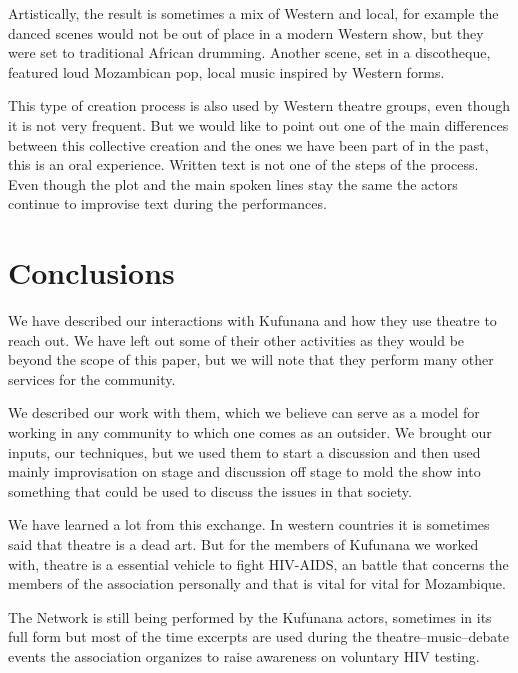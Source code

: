 \documentclass[article,twocolumn]{memoir}
\begin{document}
Artistically, the result is sometimes a mix of Western and local, for example
the danced scenes would not be out of place in a modern Western show, but they
were set to traditional African drumming. Another scene, set in a discotheque,
featured loud Mozambican pop, local music inspired by Western forms.

This type of creation process is also used by Western theatre groups, even
though it is not very frequent. But we would like to point out one of the main
differences between this collective creation and the ones we have been part of
in the past, this is an oral experience. Written text is not one of the steps of
the process. Even though the plot and the main spoken lines stay the same the
actors continue to improvise text during the performances.

\chapter{Conclusions}

We have described our interactions with Kufunana and how they use theatre to
reach out. We have left out some of their other activities as they would be
beyond the scope of this paper, but we will note that they perform many other
services for the community.

We described our work with them, which we believe can serve as a model for
working in any community to which one comes as an outsider. We brought our
inputs, our techniques, but we used them to start a discussion and then used
mainly improvisation on stage and discussion off stage to mold the show into
something that could be used to discuss the issues in that society.

We have learned a lot from this exchange. In western countries it is sometimes
said that theatre is a dead art. But for the members of Kufunana we worked
with, theatre is a essential vehicle to fight HIV-AIDS, an battle that concerns
the members of the association personally and that is vital for vital for
Mozambique.

The Network is still being performed by the Kufunana actors, sometimes in its
full form but most of the time excerpts are used during the
theatre--music--debate events the association organizes to raise awareness on
voluntary HIV testing.
\end{document}
